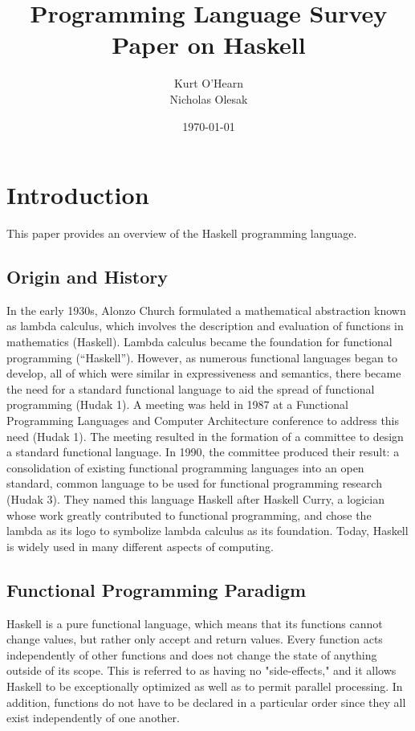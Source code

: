 \documentclass[titlepage,12pt]{article}
\title{Programming Language Survey Paper on Haskell}
\author{
        Kurt O'Hearn\\
        Nicholas Olesak\\
}
\date{\today}
\begin{document}
\maketitle 
\setcounter{tocdepth}{3}
\tableofcontents \newpage

\section{Introduction}
This paper provides an overview of the Haskell programming language.

\subsection{Origin and History}

In the early 1930s, Alonzo Church formulated a mathematical abstraction known as lambda calculus, which involves the description and evaluation of functions in mathematics (Haskell). Lambda calculus became the foundation for functional programming (``Haskell''). However, as numerous functional languages began to develop, all of which were similar in expressiveness and semantics, there became the need for a standard functional language to aid the spread of functional programming (Hudak 1). A meeting was held in 1987 at a Functional Programming Languages and Computer Architecture conference to address this need (Hudak 1). The meeting resulted in the formation of a committee to design a standard functional language. In 1990, the committee produced their result: a consolidation of existing functional programming languages into an open standard, common language to be used for functional programming research (Hudak 3). They named this language Haskell after Haskell Curry, a logician whose work greatly contributed to functional programming,
and chose the lambda as its logo to symbolize lambda calculus as its foundation. Today, Haskell is widely used in many different aspects of computing. 

\subsection{Functional Programming Paradigm}

Haskell is a pure functional language, which means that its functions cannot change values, but rather only accept and return values. Every function acts independently of other functions and does not change the state of anything outside of its scope. This is referred to as having no "side-effects," and it allows Haskell to be exceptionally optimized as well as to permit parallel processing. In addition, functions do not have to be declared in a particular order since they all exist independently of one another. 
\end{document}
